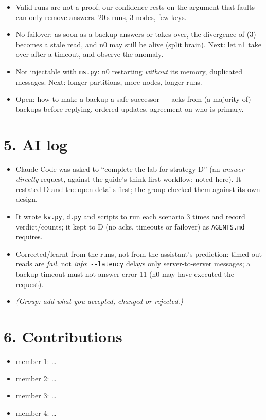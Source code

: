 \documentclass[a4paper,10pt]{article}
\newcommand{\opt}[1]{\texttt{-{}-#1}}
\begin{document}
\begin{itemize}
\item Valid runs are not a proof; our confidence rests on the argument
  that faults can only remove answers. 20\,s runs, 3 nodes, few keys.
\item No failover: as soon as a backup answers or takes over, the
  divergence of (3) becomes a stale read, and n0 may still be alive (split
  brain). Next: let n1 take over after a timeout, and observe the anomaly.
\item Not injectable with \texttt{ms.py}: n0 restarting \emph{without} its
  memory, duplicated messages. Next: longer partitions, more nodes,
  longer runs.
\item Open: how to make a backup a safe successor --- acks from (a
  majority of) backups before replying, ordered updates, agreement on who
  is primary.
\end{itemize}

\section*{5. AI log}

\begin{itemize}
\item Claude Code was asked to ``complete the lab for strategy D'' (an
  \emph{answer directly} request, against the guide's
  think-first workflow: noted here). It restated D and the open details
  first; the group checked them against its own design.
\item It wrote \texttt{kv.py}, \texttt{d.py} and scripts to run each
  scenario 3 times and record verdict/counts; it kept to D (no acks,
  timeouts or failover) as \texttt{AGENTS.md} requires.\item Corrected/learnt from the runs, not from the assistant's prediction:
  timed-out reads are \emph{fail}, not \emph{info}; \opt{latency}
  delays only server-to-server messages; a backup timeout must not answer
  error 11 (n0 may have executed the request).
\item \emph{(Group: add what you accepted, changed or rejected.)}
\end{itemize}

\section*{6. Contributions}

\begin{itemize}
\item member 1: \dots
\item member 2: \dots
\item member 3: \dots
\item member 4: \dots
\end{itemize}
\end{document}
